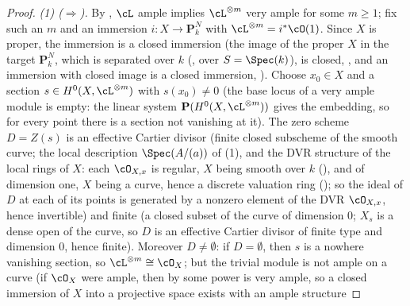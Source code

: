 \begin{proof}
\emph{(1) ($\Rightarrow$).}  By , $\cL$ ample implies
$\cL^{\otimes m}$ very ample for some $m\ge1$; fix such an $m$ and an
immersion $i:X\to\mathbf P^N_k$ with
$\cL^{\otimes m}=i^*\cO(1)$.  Since $X$ is proper, the immersion is a
closed immersion (the image of the proper $X$ in the target
$\mathbf P^N_k$, which is separated over $k$
(, over $S=\Spec(k)$), is closed,
, and an
immersion with closed image is a closed immersion,
).
Choose $x_0\in X$ and a section $s\in H^0(X,\cL^{\otimes m})$ with
$s(x_0)\neq0$ (the base locus of a very ample module is empty: the
linear system $\mathbf P(H^0(X,\cL^{\otimes m}))$ gives the embedding,
so for every point there is a section not vanishing at it).  The zero
scheme $D=Z(s)$ is an effective Cartier divisor (finite closed
subscheme of the smooth curve; the local description
$\Spec(A/(a))$ of (1), and the DVR
structure of the local rings of
$X$: each $\cO_{X,x}$ is regular, $X$ being smooth over $k$
(), and of dimension one, $X$
being a curve, hence a discrete valuation ring
(); so the ideal of $D$ at each of its
points is generated by a nonzero element of the DVR $\cO_{X,x}$, hence
invertible) and finite (a closed subset of the curve of dimension $0$;
$X_s$ is a dense open of the curve, so $D$ is an effective Cartier
divisor of finite type and dimension $0$, hence finite).  Moreover
$D\neq\emptyset$: if $D=\emptyset$, then $s$ is a nowhere vanishing
section, so $\cL^{\otimes m}\cong\cO_X$; but the trivial module is not
ample on a curve (if $\cO_X$ were ample,
then by  some power is very ample, so a closed
immersion of $X$ into a projective space exists with an ample structure

\end{proof}

